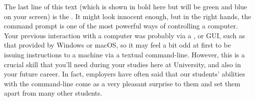 %

The last line of this text (which is shown in bold here but will be green and blue on your screen) is the . It might look innocent enough, but in the right hands, the command prompt is one of the most powerful ways of controlling a computer. Your previous interaction with a computer was probably via  a , or GUI, such as that provided by Windows or macOS, so  it may feel a bit odd at first to be issuing instructions to a machine via a textual command-line. However, this is a crucial skill that you'll need during your studies here at University, and also in your future career. In fact, employers have often said that our students' abilities with the command-line come as a very pleasant surprise to them and set them apart from many other students.


